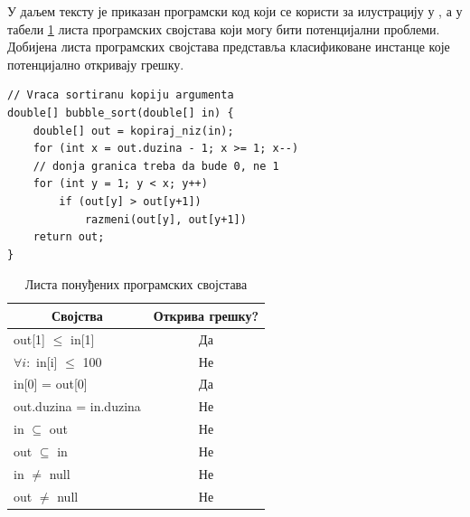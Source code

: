 \documentclass[a4paper]{article}
\begin{document}
{%

У даљем тексту је приказан програмски код који се користи за илустрацију у \cite{Brun04findinglatent}, а у табели \ref{table:latent_example}
листа програмских својстава који могу бити потенцијални проблеми. Добијена листа програмских својстава
представља класификоване инстанце које потенцијално откривају грешку.

\begin{verbatim}
// Vraca sortiranu kopiju argumenta
double[] bubble_sort(double[] in) {
    double[] out = kopiraj_niz(in);
    for (int x = out.duzina - 1; x >= 1; x--)
    // donja granica treba da bude 0, ne 1
    for (int y = 1; y < x; y++)
        if (out[y] > out[y+1])
            razmeni(out[y], out[y+1])
    return out;
}
\end{verbatim}




\begin{table}[]
\centering
\caption{Листа понуђених програмских својстава}
\label{table:latent_example}
\begin{tabular}{|l|c|}
\hline
\multicolumn{1}{|c|}{Својства} & Открива грешку? \\ \hline
out[1] $\leq$ in[1]                           & Да              \\ \hline
$\forall i:$ in[i] $\leq$ 100                           & Не              \\ \hline
in[0] = out[0]        & Да              \\ \hline
out.duzina = in.duzina         & Не              \\ \hline
in $\subseteq$ out                  & Не              \\ \hline
out $\subseteq$ in                  & Не              \\ \hline
in $\neq$ null                     & Не              \\ \hline
out $\neq$ null                    & Не              \\ \hline
\end{tabular}
\end{table}

}
\end{document}
